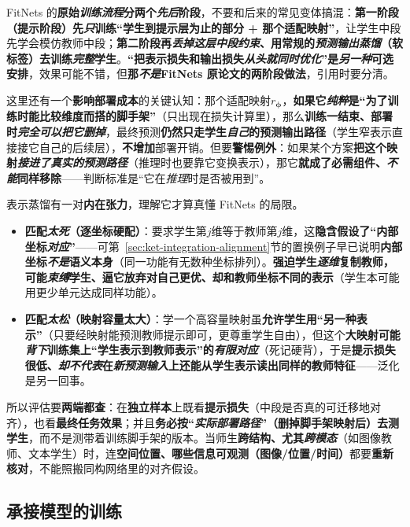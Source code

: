 FitNets 的\textbf{原始\emph{训练流程}分两个\emph{先后}阶段}，不要和后来的常见变体搞混：\textbf{第一阶段（提示阶段）先\emph{只}训练“学生到提示层为止的部分 + 那个适配映射”}，让学生中段先学会模仿教师中段；\textbf{第二阶段再\emph{丢掉这层中段约束}、用常规的\emph{预测输出蒸馏}（软标签）去训练\emph{完整}学生}。\textbf{“把表示损失和输出损失\emph{从头就\emph{同时}优化}”是\emph{另一种}可选安排}，效果可能不错，但\textbf{那\emph{不是}FitNets 原论文的两阶段做法}，引用时要分清。

这里还有一个\textbf{影响部署成本}的关键认知：那个适配映射$r_{\bm{\phi}}$，\textbf{如果它\emph{纯粹}是“为了训练时能比较维度而搭的脚手架”}（只出现在损失计算里），那么\textbf{训练一结束、部署时\emph{完全可以把它删掉}}，最终预测\textbf{仍然只走学生\emph{自己}的预测输出路径}（学生窄表示直接接它自己的后续层），\textbf{不增加}部署开销。但要\textbf{警惕例外}：如果某个方案\textbf{把这个映射\emph{接进了真实的预测路径}}（推理时也要靠它变换表示），那它\textbf{就成了必需组件、\emph{不能}同样移除}——判断标准是“它在\emph{推理}时是否被用到”。

表示蒸馏有一对\textbf{内在张力}，理解它才算真懂 FitNets 的局限。
\begin{itemize}\item \textbf{匹配\emph{太死}（逐坐标硬配）}：要求学生第$j$维等于教师第$j$维，这\textbf{隐含假设了“内部坐标\emph{对应}”}——可第~\ref{sec:ket-integration-alignment}节的置换例子早已说明\textbf{内部坐标\emph{不是}语义本身}（同一功能有无数种坐标排列）。\textbf{强迫学生\emph{逐维}复制教师，可能\emph{束缚}学生、逼它放弃对自己更优、却和教师坐标不同的表示}（学生本可能用更少单元达成同样功能）。\item \textbf{匹配\emph{太松}（映射容量太大）}：学一个高容量映射虽\textbf{允许学生用“另一种表示”}（只要经映射能预测教师提示即可，更尊重学生自由），但这个\textbf{大映射可能\emph{背下}训练集上“学生表示到教师表示”的\emph{有限对应}}（死记硬背），于是\textbf{提示损失很低、\emph{却不代表}在\emph{新预测输入}上还能从学生表示读出同样的教师特征}——泛化是另一回事。\end{itemize}
所以评估要\textbf{两端都查}：在\textbf{独立样本}上既看\textbf{提示损失}（中段是否真的可迁移地对齐），也看\textbf{最终任务效果}；并且\textbf{务必按“\emph{实际部署路径}”（删掉脚手架映射后）去测学生}，而不是测带着训练脚手架的版本。当师生\textbf{跨结构、尤其\emph{跨模态}}（如图像教师、文本学生）时，连\textbf{空间位置、哪些信息可观测（图像/位置/时间）}都要\textbf{重新核对}，不能照搬同构网络里的对齐假设。

\subsection{承接模型的训练}
\label{sec:ket-integration-student-training}

